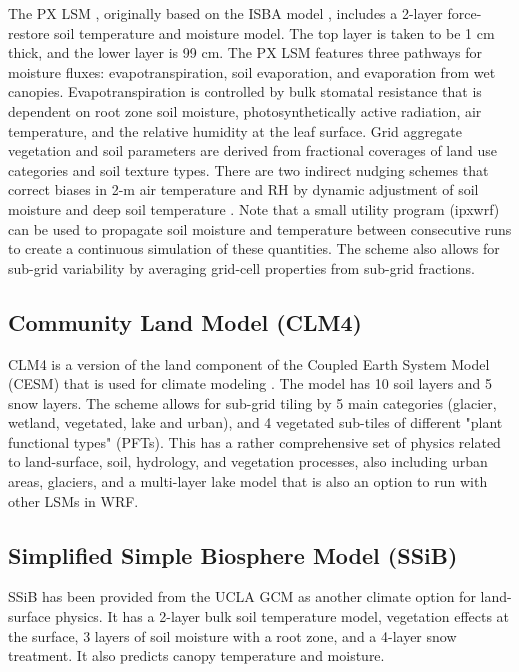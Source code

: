 The PX LSM \citep{pleim95, xiu01}, originally based on the ISBA model \citet{noilhan89}, includes a 2-layer force-restore soil temperature and moisture model.  The top layer is taken to be 1 cm thick, and the lower layer is 99 cm. The PX LSM features three pathways for moisture fluxes: evapotranspiration, soil evaporation, and evaporation from wet canopies.  Evapotranspiration is controlled by bulk stomatal resistance that is dependent on root zone soil moisture, photosynthetically active radiation, air temperature, and the relative humidity at the leaf surface.   Grid aggregate vegetation and soil parameters are derived from fractional coverages of land use categories and soil texture types.  There are two indirect nudging schemes that correct biases in 2-m air temperature and RH by dynamic adjustment of soil moisture \citep{pleim03} and deep soil temperature \citep{pleim08}.  Note that a small utility program (ipxwrf) can be used to propagate soil moisture and temperature between consecutive runs to create a continuous simulation of these quantities. The scheme also
allows for sub-grid variability by averaging grid-cell properties from sub-grid fractions.

\subsection{Community Land Model (CLM4)}

CLM4 is a version of the land component of the Coupled Earth System Model (CESM) that is used for climate modeling \citep{oleson10, lawrence11}. 
The model has 10 soil layers and 5 snow layers.
The scheme allows for sub-grid tiling by 5 main categories (glacier, wetland, vegetated, lake and urban), and 4 vegetated sub-tiles of different "plant functional types" (PFTs).
This has a rather comprehensive set of physics related to land-surface, soil, hydrology, and vegetation processes, also including urban areas, glaciers, and a multi-layer lake
model that is also an option to run with other LSMs in WRF.

\subsection{Simplified Simple Biosphere Model (SSiB)}

SSiB \citep{xue91, sun01} has been provided from the UCLA GCM as another climate option for land-surface physics. It has a 2-layer bulk soil temperature model,
vegetation effects at the surface, 3 layers of soil moisture with a root zone, and a 4-layer snow treatment. It also predicts canopy temperature and moisture.

